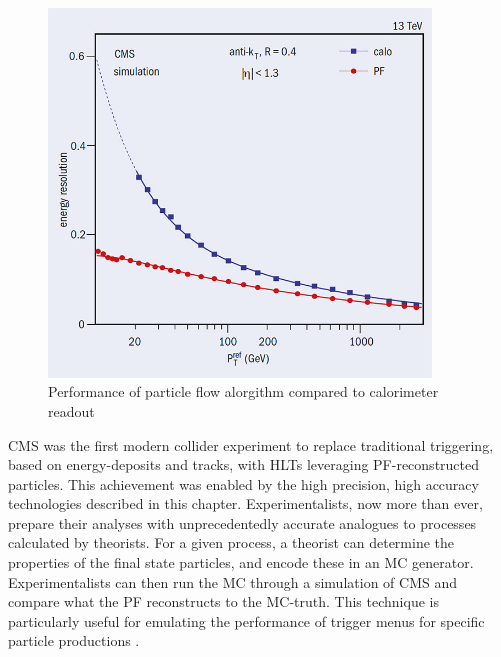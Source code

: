 \begin{figure}[h!]
\begin{centering}
\includegraphics[width=4in]{Chapter3/importfigs/CCrec2_05_16.jpg}
\par\end{centering}
\caption{Performance of particle flow alorgithm compared to calorimeter readout \cite{Sirunyan:2017ulk} \label{fig:pfPerf}}
\end{figure}

CMS was the first modern collider experiment to replace traditional triggering, based on energy-deposits and tracks, with HLTs leveraging PF-reconstructed particles. This achievement was enabled by the high precision, high accuracy technologies described in this chapter. Experimentalists, now more than ever, prepare their analyses with unprecedentedly accurate analogues to processes calculated by theorists. For a given process, a theorist can determine the properties of the final state particles, and encode these in an MC generator. Experimentalists can then run the MC through a simulation of CMS and compare what the PF reconstructs to the MC-truth. This technique is particularly useful for emulating the performance of trigger menus for specific particle productions \cite{Beaudette:2014cea}. 